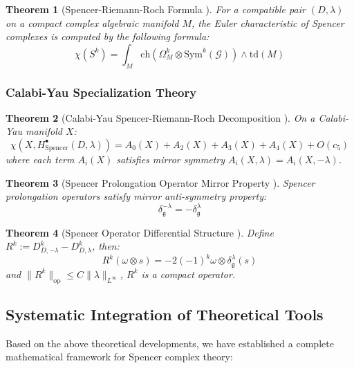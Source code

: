 \documentclass[a4paper,12pt]{extarticle}
\theoremstyle{plain}
\newtheorem{theorem}{Theorem}[section]
\theoremstyle{definition}
\begin{document}
\begin{theorem}[Spencer-Riemann-Roch Formula \cite{zheng2025spencer-riemann-roch}]
\label{thm:spencer-riemann-roch}
For a compatible pair $(D,\lambda)$ on a compact complex algebraic manifold $M$, the Euler characteristic of Spencer complexes is computed by the following formula:
$$\chi(S^k) = \int_M \mathrm{ch}(\Omega^k_M \otimes \mathrm{Sym}^k(\mathcal{G})) \wedge \mathrm{td}(M)$$
\end{theorem}

\subsubsection{Calabi-Yau Specialization Theory \cite{zheng2025analytic}}

\begin{theorem}[Calabi-Yau Spencer-Riemann-Roch Decomposition \cite{zheng2025analytic}]
\label{thm:calabi-yau-decomposition}
On a Calabi-Yau manifold $X$:
$$\chi(X, H^\bullet_{\mathrm{Spencer}}(D,\lambda)) = A_0(X) + A_2(X) + A_3(X) + A_4(X) + O(c_5)$$
where each term $A_i(X)$ satisfies mirror symmetry $A_i(X,\lambda) = A_i(X,-\lambda)$.
\end{theorem}

\begin{theorem}[Spencer Prolongation Operator Mirror Property \cite{zheng2025analytic}]
\label{thm:spencer-operator-mirror}
Spencer prolongation operators satisfy mirror anti-symmetry property:
$$\delta^{-\lambda}_\mathfrak{g} = -\delta^\lambda_\mathfrak{g}$$
\end{theorem}

\begin{theorem}[Spencer Operator Differential Structure \cite{zheng2025analytic}]
\label{thm:spencer-differential-structure}
Define $R^k := D^k_{D,-\lambda} - D^k_{D,\lambda}$, then:
$$R^k(\omega \otimes s) = -2(-1)^k \omega \otimes \delta^\lambda_\mathfrak{g}(s)$$
and $\|R^k\|_{\mathrm{op}} \leq C\|\lambda\|_{L^\infty}$, $R^k$ is a compact operator.
\end{theorem}

\subsection{Systematic Integration of Theoretical Tools}

Based on the above theoretical developments, we have established a complete mathematical framework for Spencer complex theory:
\end{document}
